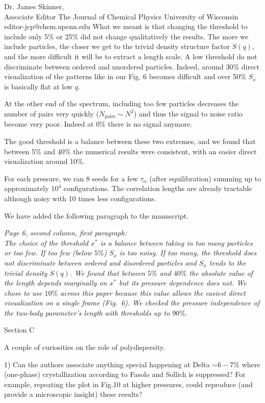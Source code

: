 \documentclass[a4paper, rebuttal, parskip=true, firsthead=false, fromemail=false, foldmarks=false]{scrlttr2}
\begin{document}
\begin{letter}{Dr. James Skinner,\\Associate Editor
The Journal of Chemical Physics
University of Wisconsin\\
editor-jcp@chem.upenn.edu }
What we meant is that changing the threshold to include only 5\% or 25\% did not change qualitatively the results. The more we include particles, the closer we get to the trivial density structure factor $S(q)$, and the more difficult it will be to extract a length scale. A low threshold do not discriminate between ordered and unordered particles. Indeed, around 30\% direct visualization of the patterns like in our Fig. 6 becomes difficult and over 50\% $S_x$ is basically flat at low $q$. 

At the other end of the spectrum, including too few particles decreases the number of pairs very quickly ($N_\text{pairs}\sim N^2$) and thus the signal to noise ratio become very poor. Indeed at 0\% there is no signal anymore.

The good threshold is a balance between these two extremes, and we found that between 5\% and 40\% the numerical results were consistent, with an easier direct visualization around 10\%.

For each pressure, we ran 8 seeds for a few $\tau_\alpha$ (after equilibration) summing up to approximately $10^4$ configurations. The correlation lengths are already tractable although noisy with 10 times less configurations.

We have added the following paragraph to the manuscript.

{\it Page 6, second column, first paragraph:\\
The choice of the threshold $x^*$ is a balance between taking in too many particles or too few. If too few (below $5\%$) $S_x$ is too noisy. If too many, the threshold does not discriminate between ordered and disordered particles and $S_x$ tends to the trivial density $S(q)$. We found that between $5\%$ and $40\%$ the absolute value of the length depends marginally on $x^*$ but its pressure dependence does not. We chose to use $10\%$ across this paper because this value allows the easiest direct visualization on a single frame (Fig.~6). We checked the pressure independence of the two-body parameter's length with thresholds up to $90\%$. 
} 

\begin{quotationi}
Section C

A couple of curiosities on the role of polydispersity.

1) Can the authors associate anything special happening at Delta $\sim6-7\%$ where (one-phase) crystallization according to Fasolo and Sollich is suppressed? For example, repeating the plot in Fig.10 at higher pressures, could reproduce (and provide a microscopic insight) these results?
\end{quotationi}


\end{letter}
\end{document}
